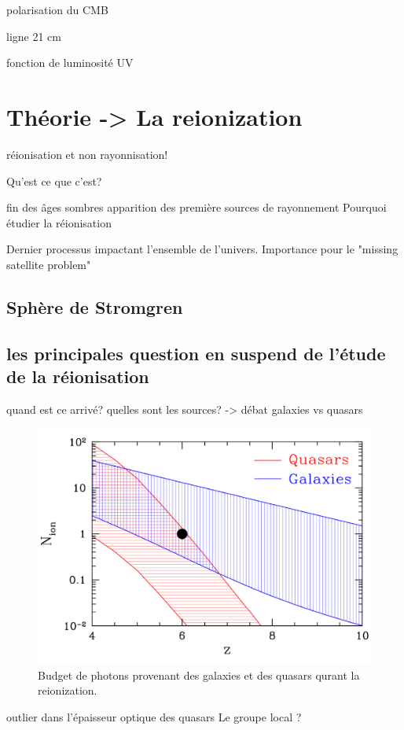 polarisation du CMB

ligne 21 cm

fonction de luminosité UV



\section{Théorie -> La reionization}

réionisation et non rayonnisation!

Qu'est ce que c'est?

fin des âges sombres
apparition des première sources de rayonnement
Pourquoi étudier la réionisation

Dernier processus impactant l'ensemble de l'univers.
Importance pour le "missing satellite problem"

\subsection{Sphère de Stromgren}


\subsection{les principales question en suspend de l'étude de la réionisation}

quand est ce arrivé?
quelles sont les sources? -> débat galaxies vs quasars
\begin{figure}[bth]
        \includegraphics[width=.95\linewidth]{img/01/gal_AGN.pdf} 
        \caption{
        Budget de photons provenant des galaxies et des quasars qurant la reionization.
}
 		\label{fig:gal_AGN}
\end{figure}

outlier dans l'épaisseur optique des quasars
Le groupe local ?


